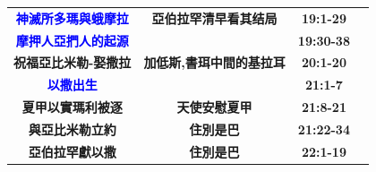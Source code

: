 \begin{table}[H]
\begin{threeparttable}
\begin{tabular}{c c c c}
\multicolumn{1}{L{\dimexpr0.25\linewidth-1\tabcolsep\relax}}{\bfseries \textcolor{blue}{神滅所多瑪與蛾摩拉}} 
& \multicolumn{1}{L{\dimexpr0.25\linewidth-1\tabcolsep\relax}}{\bfseries 亞伯拉罕清早看其结局}  
& \multicolumn{1}{L{\dimexpr0.1\linewidth-1\tabcolsep\relax}}{\bfseries 19:1-29}
& \multicolumn{1}{L{\dimexpr0.2\linewidth-1\tabcolsep\relax}}{\bfseries }\\

\multicolumn{1}{L{\dimexpr0.25\linewidth-1\tabcolsep\relax}}{\bfseries \textcolor{blue}{摩押人亞捫人的起源}}  
& \multicolumn{1}{L{\dimexpr0.2\linewidth-1\tabcolsep\relax}}{\bfseries } 
& \multicolumn{1}{L{\dimexpr0.1\linewidth-1\tabcolsep\relax}}{\bfseries 19:30-38}
& \multicolumn{1}{L{\dimexpr0.2\linewidth-1\tabcolsep\relax}}{\bfseries }\\

\multicolumn{1}{L{\dimexpr0.25\linewidth-1\tabcolsep\relax}}{\bfseries 祝福亞比米勒-娶撒拉} 
& \multicolumn{1}{L{\dimexpr0.25\linewidth-1\tabcolsep\relax}}{\bfseries 加低斯,書珥中間的基拉耳}  
& \multicolumn{1}{L{\dimexpr0.1\linewidth-1\tabcolsep\relax}}{\bfseries 20:1-20}
& \multicolumn{1}{L{\dimexpr0.2\linewidth-1\tabcolsep\relax}}{\bfseries }\\

\multicolumn{1}{L{\dimexpr0.25\linewidth-1\tabcolsep\relax}}{\bfseries \textcolor{blue}{以撒出生}} 
& \multicolumn{1}{L{\dimexpr0.2\linewidth-1\tabcolsep\relax}}{\bfseries }  
& \multicolumn{1}{L{\dimexpr0.1\linewidth-1\tabcolsep\relax}}{\bfseries 21:1-7}
& \multicolumn{1}{L{\dimexpr0.2\linewidth-1\tabcolsep\relax}}{\bfseries }\\

\multicolumn{1}{L{\dimexpr0.25\linewidth-1\tabcolsep\relax}}{\bfseries 夏甲以實瑪利被逐}  
& \multicolumn{1}{L{\dimexpr0.2\linewidth-1\tabcolsep\relax}}{\bfseries 天使安慰夏甲} 
& \multicolumn{1}{L{\dimexpr0.1\linewidth-1\tabcolsep\relax}}{\bfseries 21:8-21}
& \multicolumn{1}{L{\dimexpr0.2\linewidth-1\tabcolsep\relax}}{\bfseries }\\\hline

\multicolumn{1}{L{\dimexpr0.25\linewidth-1\tabcolsep\relax}}{\bfseries 與亞比米勒立約} 
& \multicolumn{1}{L{\dimexpr0.2\linewidth-1\tabcolsep\relax}}{\bfseries 住別是巴}  
& \multicolumn{1}{L{\dimexpr0.1\linewidth-1\tabcolsep\relax}}{\bfseries 21:22-34}
& \multicolumn{1}{L{\dimexpr0.2\linewidth-1\tabcolsep\relax}}{\bfseries }\\ 

\multicolumn{1}{L{\dimexpr0.25\linewidth-1\tabcolsep\relax}}{\bfseries 亞伯拉罕獻以撒}  
& \multicolumn{1}{L{\dimexpr0.2\linewidth-1\tabcolsep\relax}}{\bfseries 住別是巴} 
& \multicolumn{1}{L{\dimexpr0.1\linewidth-1\tabcolsep\relax}}{\bfseries 22:1-19}
& \multicolumn{1}{L{\dimexpr0.2\linewidth-1\tabcolsep\relax}}{\bfseries }\\


\end{tabular}
\end{threeparttable}
\end{table}
